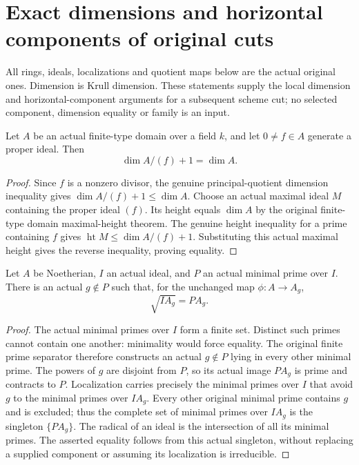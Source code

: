 \section{Exact dimensions and horizontal components of original cuts}
All rings, ideals, localizations and quotient maps below are the actual
original ones. Dimension is Krull dimension. These statements supply
the local dimension and horizontal-component arguments for a subsequent
scheme cut; no selected component, dimension equality or family is an input.

\begin{lemma}
\label{lem:pl-gauss-affine-principal-quotient-dimension}
\leanok
Let $A$ be an actual finite-type domain over a field $k$, and let
$0\ne f\in A$ generate a proper ideal. Then
\[
 \dim A/(f)+1=\dim A.
\]
\end{lemma}
\begin{proof}
Since $f$ is a nonzero divisor, the genuine principal-quotient dimension
inequality gives $\dim A/(f)+1\le\dim A$. Choose an actual maximal
ideal $M$ containing the proper ideal $(f)$. Its height equals $\dim A$
by the original finite-type domain maximal-height theorem. The genuine
height inequality for a prime containing $f$ gives
$\operatorname{ht}M\le\dim A/(f)+1$. Substituting this actual maximal
height gives the reverse inequality, proving equality.
\end{proof}

\begin{lemma}
\label{lem:pl-gauss-minimal-prime-isolated-away}
\leanok
Let $A$ be Noetherian, $I$ an actual ideal, and $P$ an actual minimal
prime over $I$. There is an actual $g\notin P$ such that, for the
unchanged map $\phi:A\to A_g$,
\[
 \sqrt{IA_g}=PA_g.
\]
\end{lemma}
\begin{proof}
The actual minimal primes over $I$ form a finite set. Distinct such
primes cannot contain one another: minimality would force equality.
The original finite prime separator therefore constructs an actual
$g\notin P$ lying in every other minimal prime. The powers of $g$ are
disjoint from $P$, so its actual image $PA_g$ is prime and contracts to
$P$. Localization carries precisely the minimal primes over $I$ that
avoid $g$ to the minimal primes over $IA_g$. Every other original
minimal prime contains $g$ and is excluded; thus the complete set of
minimal primes over $IA_g$ is the singleton $\{PA_g\}$. The radical
of an ideal is the intersection of all its minimal primes. The asserted
equality follows from this actual singleton, without replacing a
supplied component or assuming its localization is irreducible.
\end{proof}

